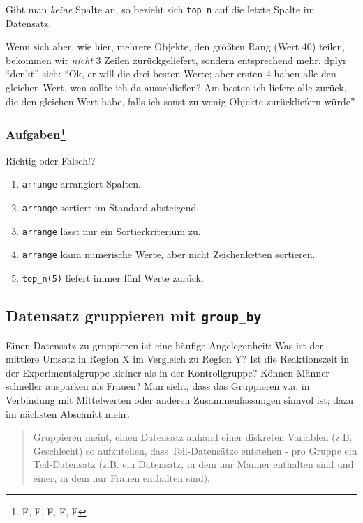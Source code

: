 \documentclass[12pt,ngerman,]{book}
\providecommand{\tightlist}{%
  \setlength{\itemsep}{0pt}\setlength{\parskip}{0pt}}
\let\rmarkdownfootnote\footnote%
\def\footnote{\protect\rmarkdownfootnote}
\let\BeginKnitrBlock\begin \let\EndKnitrBlock\end
\begin{document}
Gibt man \emph{keine} Spalte an, so bezieht sich \texttt{top\_n} auf die
letzte Spalte im Datensatz.

Wenn sich aber, wie hier, mehrere Objekte, den größten Rang (Wert 40)
teilen, bekommen wir \emph{nicht} 3 Zeilen zurückgeliefert, sondern
entsprechend mehr. dplyr ``denkt'' sich: ``Ok, er will die drei besten
Werte; aber ersten 4 haben alle den gleichen Wert, wen sollte ich da
ausschließen? Am besten ich liefere alle zurück, die den gleichen Wert
habe, falls ich sonst zu wenig Objekte zurückliefern würde''.

\subsubsection[Aufgaben]{\texorpdfstring{Aufgaben\footnote{F, F, F, F, F}}{Aufgaben}}\label{aufgaben-5}

\BeginKnitrBlock{rmdexercises}
Richtig oder Falsch!?

\begin{enumerate}
\def\labelenumi{\arabic{enumi}.}
\tightlist
\item
  \texttt{arrange} arrangiert Spalten.
\item
  \texttt{arrange} sortiert im Standard absteigend.
\item
  \texttt{arrange} lässt nur ein Sortierkriterium zu.
\item
  \texttt{arrange} kann numerische Werte, aber nicht Zeichenketten
  sortieren.
\item
  \texttt{top\_n(5)} liefert immer fünf Werte zurück.
\end{enumerate}
\EndKnitrBlock{rmdexercises}

\subsection{\texorpdfstring{Datensatz gruppieren mit
\texttt{group\_by}}{Datensatz gruppieren mit group\_by}}\label{datensatz-gruppieren-mit-group_by}

Einen Datensatz zu gruppieren ist eine häufige Angelegenheit: Was ist
der mittlere Umsatz in Region X im Vergleich zu Region Y? Ist die
Reaktionszeit in der Experimentalgruppe kleiner als in der
Kontrollgruppe? Können Männer schneller ausparken als Frauen? Man sieht,
dass das Gruppieren v.a. in Verbindung mit Mittelwerten oder anderen
Zusammenfassungen sinnvol ist; dazu im nächsten Abschnitt mehr.

\begin{quote}
Gruppieren meint, einen Datensatz anhand einer diskreten Variablen (z.B.
Geschlecht) so aufzuteilen, dass Teil-Datensätze entstehen - pro Gruppe
ein Teil-Datensatz (z.B. ein Datensatz, in dem nur Männer enthalten sind
und einer, in dem nur Frauen enthalten sind).
\end{quote}
\end{document}
